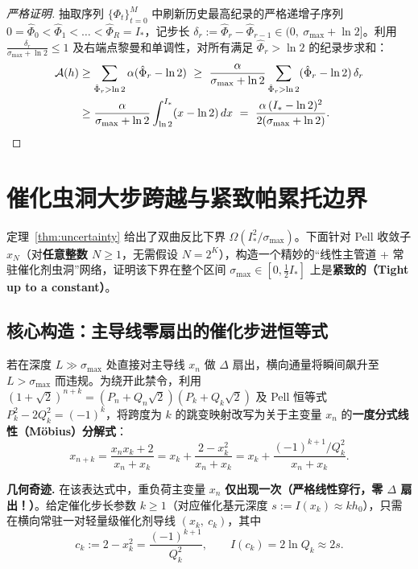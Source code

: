 \documentclass[11pt,a4paper]{ctexart}
\theoremstyle{plain}
\theoremstyle{definition}
\newcommand{\cA}{\mathcal{A}}
\begin{document}
\begin{proof}[严格证明]
抽取序列 $\{\Phi_t\}_{t=0}^{M}$ 中刷新历史最高纪录的严格递增子序列 $0 = \hat\Phi_0 < \hat\Phi_1 < \dots < \hat\Phi_R = I_*$，记步长 $\delta_r := \hat\Phi_r - \hat\Phi_{r-1} \in (0,\ \sigma_{\max} + \ln 2]$。利用 $\frac{\delta_r}{\sigma_{\max} + \ln 2} \le 1$ 及右端点黎曼和单调性，对所有满足 $\hat\Phi_r > \ln 2$ 的纪录步求和：
\begin{align*}
\cA(h)
&\ge \sum_{\hat\Phi_r > \ln 2} \alpha(\hat\Phi_r - \ln 2)
\ \ge\ \frac{\alpha}{\sigma_{\max} + \ln 2} \sum_{\hat\Phi_r > \ln 2} (\hat\Phi_r - \ln 2)\,\delta_r \\
&\ge \frac{\alpha}{\sigma_{\max} + \ln 2} \int_{\ln 2}^{I_*} (x - \ln 2)\,dx
\ =\ \frac{\alpha\,(I_* - \ln 2)^2}{2(\sigma_{\max} + \ln 2)} . \qedhere
\end{align*}
\end{proof}

\section{催化虫洞大步跨越与紧致帕累托边界}

定理~\ref{thm:uncertainty} 给出了双曲反比下界 $\Omega(I_*^2 / \sigma_{\max})$。下面针对 Pell 收敛子 $x_N$（对\textbf{任意整数 $N \ge 1$}，无需假设 $N = 2^K$），构造一个精妙的“线性主管道 + 常驻催化剂虫洞”网络，证明该下界在整个区间 $\sigma_{\max} \in [0, \frac{1}{2}I_*]$ 上是\textbf{紧致的（Tight up to a constant）}。

\subsection*{核心构造：主导线零扇出的催化步进恒等式}

若在深度 $L \gg \sigma_{\max}$ 处直接对主导线 $x_n$ 做 $\Delta$ 扇出，横向通量将瞬间飙升至 $L > \sigma_{\max}$ 而违规。为绕开此禁令，利用 $(1+\sqrt{2})^{n+k} = (P_n + Q_n\sqrt{2})(P_k + Q_k\sqrt{2})$ 及 Pell 恒等式 $P_k^2 - 2Q_k^2 = (-1)^k$，将跨度为 $k$ 的跳变映射改写为关于主变量 $x_n$ 的\textbf{一度分式线性（Möbius）分解式}：
\[
x_{n+k} = \frac{x_n x_k + 2}{x_n + x_k} = x_k + \frac{2 - x_k^2}{x_n + x_k} = x_k + \frac{(-1)^{k+1} / Q_k^2}{x_n + x_k}.
\]

\textbf{几何奇迹.} 在该表达式中，重负荷主变量 $x_n$ \textbf{仅出现一次（严格线性穿行，零 $\Delta$ 扇出！）}。给定催化步长参数 $k \ge 1$（对应催化基元深度 $s := I(x_k) \approx k h_0$），只需在横向常驻一对轻量级催化剂导线 $(x_k,\ c_k)$，其中
\[
c_k := 2 - x_k^2 = \frac{(-1)^{k+1}}{Q_k^2},
\qquad I(c_k) = 2\ln Q_k \approx 2s .
\]
\end{document}

